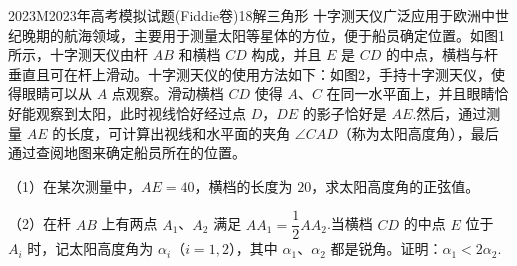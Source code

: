 
\begin{problem}{2023}{M}{2023年高考模拟试题(Fiddie卷)}{18}{解三角形}
十字测天仪广泛应用于欧洲中世纪晚期的航海领域，主要用于测量太阳等星体的方位，便于船员确定位置。如图1所示，十字测天仪由杆 $ AB $ 和横档 $ CD $ 构成，并且 $ E $ 是 $ CD $ 的中点，横档与杆垂直且可在杆上滑动。十字测天仪的使用方法如下：如图2，手持十字测天仪，使得眼睛可以从 $ A $ 点观察。滑动横档 $ CD $ 使得 $ A $、$ C $ 在同一水平面上，并且眼睛恰好能观察到太阳，此时视线恰好经过点 $ D $，$ DE $ 的影子恰好是 $ AE $.然后，通过测量 $ AE $ 的长度，可计算出视线和水平面的夹角 $ \angle CAD $（称为太阳高度角），最后通过查阅地图来确定船员所在的位置。

（1）在某次测量中，$ AE = 40 $，横档的长度为 $ 20 $，求太阳高度角的正弦值。

（2）在杆 $ AB $ 上有两点 $ A_1 $、$ A_2 $ 满足 $ AA_1 = \dfrac{1}{2}AA_2 $.当横档 $ CD $ 的中点 $ E $ 位于 $ A_i $ 时，记太阳高度角为 $ \alpha_i $（$ i = 1,2 $），其中 $ \alpha_1 $、$ \alpha_2 $ 都是锐角。证明：$ \alpha_1 < 2\alpha_2 $.
\end{problem}

\begin{answer}

\end{answer}

\begin{solutions}

\end{solutions}
